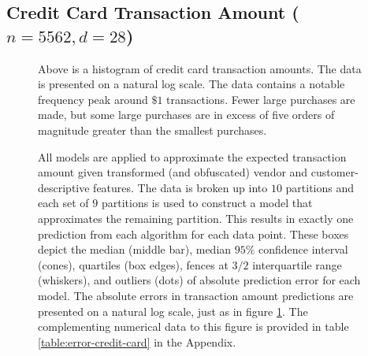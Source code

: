 \documentclass[smallextended,final]{svjour3}       %
\begin{document}
\subsection{Credit Card Transaction Amount ($n = 5562, d = 28$)}

\begin{figure}
  \centering
  \caption{Above is a histogram of credit card transaction amounts. The data is presented on a natural log scale. The data contains a notable frequency peak around $\$1$ transactions. Fewer large purchases are made, but some large purchases are in excess of five orders of magnitude greater than the smallest purchases.}
  \label{fig:hist-credit-card}
\end{figure}

\begin{figure}
  \centering
  \caption{All models are applied to approximate the expected transaction amount given transformed (and obfuscated) vendor and customer-descriptive features. The data is broken up into $10$ partitions and each set of $9$ partitions is used to construct a model that approximates the remaining partition. This results in exactly one prediction from each algorithm for each data point. These boxes depict the median (middle bar), median $95\%$ confidence interval (cones), quartiles (box edges), fences at $3/2$ interquartile range (whiskers), and outliers (dots) of absolute prediction error for each model. The absolute errors in transaction amount predictions are presented on a natural log scale, just as in figure \ref{fig:hist-credit-card}. The complementing numerical data to this figure is provided in table \ref{table:error-credit-card} in the Appendix.}
  \label{fig:error-credit-card}
\end{figure}
\end{document}
